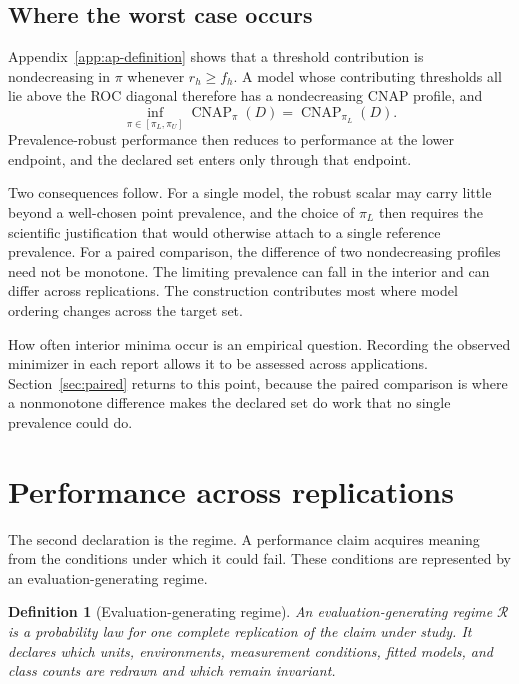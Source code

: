 \documentclass[11pt]{article}
\newcommand{\CNAP}{\operatorname{CNAP}}
\newcommand{\Regime}{\mathcal{R}}
\newtheorem{definition}{Definition}
\theoremstyle{remark}
\begin{document}
\subsection{Where the worst case occurs}
\label{sec:worst-case}

Appendix~\ref{app:ap-definition} shows that a threshold contribution is nondecreasing in $\pi$ whenever $r_h\geq f_h$. A model whose contributing thresholds all lie above the ROC diagonal therefore has a nondecreasing CNAP profile, and
\[
\inf_{\pi\in[\pi_L,\pi_U]}\CNAP_\pi(D)
=
\CNAP_{\pi_L}(D).
\]
Prevalence-robust performance then reduces to performance at the lower endpoint, and the declared set enters only through that endpoint.

Two consequences follow. For a single model, the robust scalar may carry little beyond a well-chosen point prevalence, and the choice of $\pi_L$ then requires the scientific justification that would otherwise attach to a single reference prevalence. For a paired comparison, the difference of two nondecreasing profiles need not be monotone. The limiting prevalence can fall in the interior and can differ across replications. The construction contributes most where model ordering changes across the target set.

How often interior minima occur is an empirical question. Recording the observed minimizer in each report allows it to be assessed across applications. Section~\ref{sec:paired} returns to this point, because the paired comparison is where a nonmonotone difference makes the declared set do work that no single prevalence could do.

\section{Performance across replications}
\label{sec:regime}

The second declaration is the regime. A performance claim acquires meaning from the conditions under which it could fail. These conditions are represented by an evaluation-generating regime.

\begin{definition}[Evaluation-generating regime]
An evaluation-generating regime $\Regime$ is a probability law for one complete replication of the claim under study. It declares which units, environments, measurement conditions, fitted models, and class counts are redrawn and which remain invariant.
\end{definition}
\end{document}
